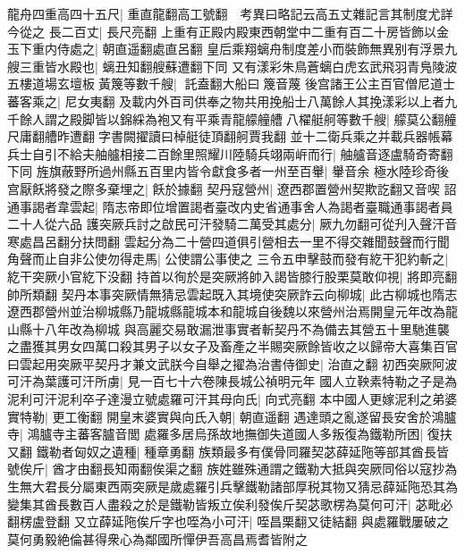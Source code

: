 龍舟四重高四十五尺|{
	重直龍翻高工號翻　考異曰略記云高五丈雜記言其制度尤詳今從之}
長二百丈|{
	長尺亮翻}
上重有正殿内殿東西朝堂中二重有百二十房皆飾以金玉下重内侍處之|{
	朝直遥翻處直呂翻}
皇后乘翔螭舟制度差小而裝飾無異别有浮景九艘三重皆水殿也|{
	螭丑知翻艘蘇遭翻下同}
又有漾彩朱鳥蒼螭白虎玄武飛羽青鳬陵波五樓道場玄壇板黃篾等數千艘|{
	託盍翻大船曰篾音蔑}
後宫諸王公主百官僧尼道士蕃客乘之|{
	尼女夷翻}
及載内外百司供奉之物共用挽船士八萬餘人其挽漾彩以上者九千餘人謂之殿脚皆以錦綵為袍又有平乘青龍艨艟艚八櫂艇舸等數千艘|{
	艨莫公翻艟尺庸翻艚昨遭翻字書闕擢讀曰棹艇徒頂翻舸賈我翻}
並十二衛兵乘之并載兵器帳幕兵士自引不給夫舳艫相接二百餘里照耀川陸騎兵翊兩㟁而行|{
	舳艫音逐盧騎奇寄翻下同}
旌旗蔽野所過州縣五百里内皆令獻食多者一州至百轝|{
	轝音余}
極水陸珍奇後宫厭飫將發之際多棄埋之|{
	飫於據翻}
契丹寇營州|{
	遼西郡置營州契欺訖翻又音喫}
詔通事謁者韋雲起|{
	隋志帝即位增置謁者臺改内史省通事舍人為謁者臺職通事謁者員二十人從六品}
護突厥兵討之啟民可汗發騎二萬受其處分|{
	厥九勿翻可從刋入聲汗音寒處昌呂翻分扶問翻}
雲起分為二十營四道俱引營相去一里不得交雜聞鼓聲而行聞角聲而止自非公使勿得走馬|{
	公使謂公事使之}
三令五申擊鼓而發有紇干犯約斬之|{
	紇干突厥小官紇下没翻}
持首以徇於是突厥將帥入謁皆膝行股栗莫敢仰視|{
	將即亮翻帥所類翻}
契丹本事突厥情無猜忌雲起既入其境使突厥詐云向柳城|{
	此古柳城也隋志遼西郡營州並治柳城縣乃龍城縣龍城本和龍城自後魏以來營州治焉開皇元年改為龍山縣十八年改為柳城}
與高麗交易敢漏泄事實者斬契丹不為備去其營五十里馳進襲之盡獲其男女四萬口殺其男子以女子及畜產之半賜突厥餘皆收之以歸帝大喜集百官曰雲起用突厥平契丹才兼文武朕今自舉之擢為治書侍御史|{
	治直之翻}
初西突厥阿波可汗為葉護可汗所虜|{
	見一百七十六卷陳長城公禎明元年}
國人立鞅素特勒之子是為泥利可汗泥利卒子達漫立號處羅可汗其母向氏|{
	向式亮翻}
本中國人更嫁泥利之弟婆實特勒|{
	更工衡翻}
開皇末婆實與向氏入朝|{
	朝直遥翻}
遇達頭之亂遂留長安舍於鴻臚寺|{
	鴻臚寺主蕃客臚音閭}
處羅多居烏孫故地撫御失道國人多叛復為鐵勒所困|{
	復扶又翻}
鐵勒者匈奴之遺種|{
	種章勇翻}
族類最多有僕骨同羅契苾薛延陁等部其酋長皆號俟斤|{
	酋才由翻長知兩翻俟渠之翻}
族姓雖殊通謂之鐵勒大抵與突厥同俗以寇抄為生無大君長分屬東西兩突厥是歲處羅引兵擊鐵勒諸部厚税其物又猜忌薛延陁恐其為變集其酋長數百人盡殺之於是鐵勒皆叛立俟利發俟斤契苾歌楞為莫何可汗|{
	苾毗必翻楞盧登翻}
又立薛延陁俟斤字也咥為小可汗|{
	咥昌栗翻又徒結翻}
與處羅戰屢破之莫何勇毅絶倫甚得衆心為鄰國所憚伊吾高昌焉耆皆附之

